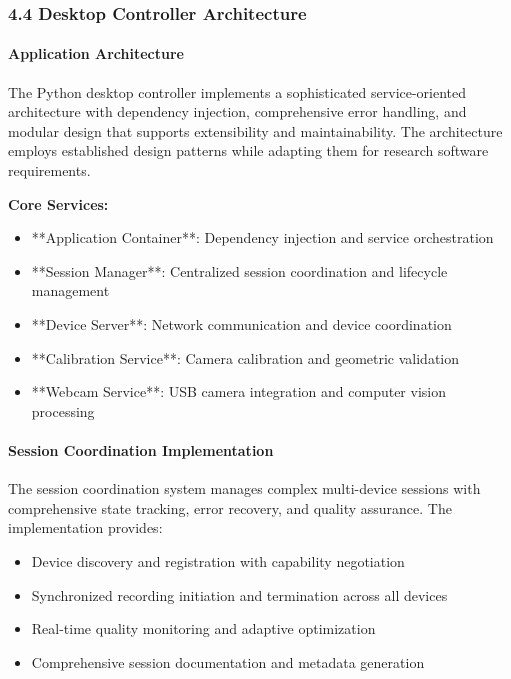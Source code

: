 \documentclass[12pt,a4paper]{report}
\begin{document}
\subsubsection{4.4 Desktop Controller Architecture}

\paragraph{Application Architecture}

The Python desktop controller implements a sophisticated service-oriented architecture with dependency injection,
comprehensive error handling, and modular design that supports extensibility and maintainability. The architecture
employs established design patterns while adapting them for research software requirements.

\textbf{Core Services:}

\begin{itemize}
\item **Application Container**: Dependency injection and service orchestration
\item **Session Manager**: Centralized session coordination and lifecycle management
\item **Device Server**: Network communication and device coordination
\item **Calibration Service**: Camera calibration and geometric validation
\item **Webcam Service**: USB camera integration and computer vision processing

\end{itemize}
\paragraph{Session Coordination Implementation}

The session coordination system manages complex multi-device sessions with comprehensive state tracking, error recovery,
and quality assurance. The implementation provides:

\begin{itemize}
\item Device discovery and registration with capability negotiation
\item Synchronized recording initiation and termination across all devices
\item Real-time quality monitoring and adaptive optimization
\item Comprehensive session documentation and metadata generation

\end{itemize}
\end{document}
